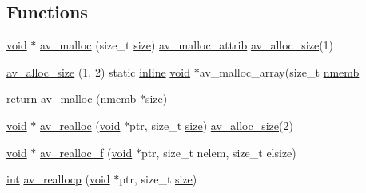 \subsection*{Functions}
\begin{DoxyCompactItemize}
\item 
\hyperlink{sound_8c_ae35f5844602719cf66324f4de2a658b3}{void} $\ast$ \hyperlink{group__lavu__mem_gacbca30ebc510a7e4156d66e7aceb2dc8}{av\+\_\+malloc} (size\+\_\+t \hyperlink{group__lavu__mem_ga854352f53b148adc24983a58a1866d66}{size}) \hyperlink{group__lavu__mem_gad48ff724186ef4e602ae7a2547e4287c}{av\+\_\+malloc\+\_\+attrib} \hyperlink{group__lavu__mem_gaf3f08c4449fbe1ad6489ad59c625ac9d}{av\+\_\+alloc\+\_\+size}(1)
\item 
\hyperlink{group__lavu__mem_ga2def36a11cc8ae1d9829c26bd7c8e988}{av\+\_\+alloc\+\_\+size} (1, 2) static \hyperlink{win_2_l_a_d_s_p_a__plugins-win_2config_8h_a00d24c7231be28dbaf71f5408f30e44c}{inline} \hyperlink{sound_8c_ae35f5844602719cf66324f4de2a658b3}{void} $\ast$av\+\_\+malloc\+\_\+array(size\+\_\+t \hyperlink{group__lavu__mem_ga79fd723df92f68cf8a6207a1d98b4c01}{nmemb}
\item 
\hyperlink{hashrout_8h_a9842e92184417c07866419916b2b3ce3}{return} \hyperlink{group__lavu__mem_ga6a21bd3a369264e61ab7a00499621fdd}{av\+\_\+malloc} (\hyperlink{group__lavu__mem_ga79fd723df92f68cf8a6207a1d98b4c01}{nmemb} $\ast$\hyperlink{group__lavu__mem_ga854352f53b148adc24983a58a1866d66}{size})
\item 
\hyperlink{sound_8c_ae35f5844602719cf66324f4de2a658b3}{void} $\ast$ \hyperlink{group__lavu__mem_ga74bb2298daa9cd0b5f1d0b2c1c3e26bb}{av\+\_\+realloc} (\hyperlink{sound_8c_ae35f5844602719cf66324f4de2a658b3}{void} $\ast$ptr, size\+\_\+t \hyperlink{group__lavu__mem_ga854352f53b148adc24983a58a1866d66}{size}) \hyperlink{group__lavu__mem_gaf3f08c4449fbe1ad6489ad59c625ac9d}{av\+\_\+alloc\+\_\+size}(2)
\item 
\hyperlink{sound_8c_ae35f5844602719cf66324f4de2a658b3}{void} $\ast$ \hyperlink{group__lavu__mem_gae5ca394e7536fcd2689008b011a211ad}{av\+\_\+realloc\+\_\+f} (\hyperlink{sound_8c_ae35f5844602719cf66324f4de2a658b3}{void} $\ast$ptr, size\+\_\+t nelem, size\+\_\+t elsize)
\item 
\hyperlink{xmltok_8h_a5a0d4a5641ce434f1d23533f2b2e6653}{int} \hyperlink{group__lavu__mem_ga162ac7cb3ff79ae050ccc25e57adfc46}{av\+\_\+reallocp} (\hyperlink{sound_8c_ae35f5844602719cf66324f4de2a658b3}{void} $\ast$ptr, size\+\_\+t \hyperlink{group__lavu__mem_ga854352f53b148adc24983a58a1866d66}{size})
\item 

\end{DoxyCompactItemize}
